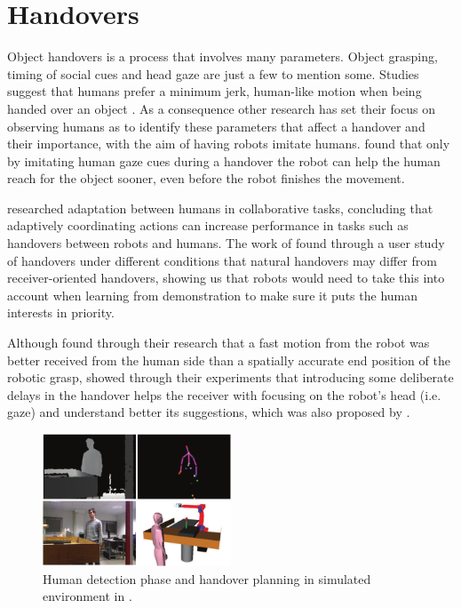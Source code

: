 \section{Handovers}
Object handovers is a process that involves many parameters. Object grasping, timing of social cues and head gaze are just a few to mention some. Studies suggest that humans prefer a minimum jerk, human-like motion when being handed over an object \parencite{Huber2008} \parencite{Huber2008a}. As a consequence other research has set their focus on observing humans as to identify these parameters that affect a handover and their importance, with the aim of having robots imitate humans. \textcite{Moon2014} found that only by imitating human gaze cues during a handover the robot can help the human reach for the object sooner, even before the robot finishes the movement.

\textcite{Huang2015} researched adaptation between humans in collaborative tasks, concluding that adaptively coordinating actions can increase performance in tasks such as handovers between robots and humans. The work of \textcite{Chan2015} found through a user study of handovers under different conditions that natural handovers may differ from receiver-oriented handovers, showing us that robots would need to take this into account when learning from demonstration to make sure it puts the human interests in priority.

Although \textcite{Koene2014} found through their research that a fast motion from the robot was better received from the human side than a spatially accurate end position of the robotic grasp, \textcite{Admoni2014} showed through their experiments that introducing some deliberate delays in the handover helps the receiver with focusing on the robot's head (i.e. gaze) and understand better its suggestions, which was also proposed by \parencite{Moon2014}.

\begin{figure}
	\centering
	\includegraphics[width=0.5\textwidth]{img/related-work/planning-simulation.png}
	\caption{Human detection phase and handover planning in simulated environment in \parencite{Aleotti2012}.}
\end{figure}

